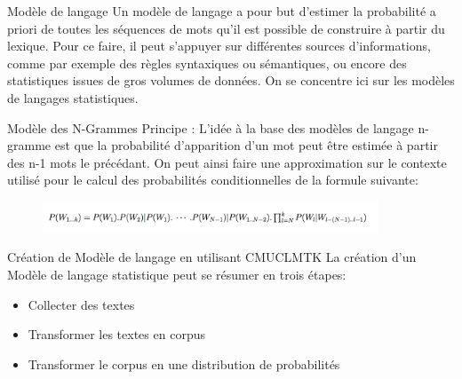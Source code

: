 \begin{frame}{Modèle de langage}
Un modèle de langage a pour but d’estimer la probabilité a priori de toutes les séquences de mots qu’il est
possible de construire à partir du lexique. Pour ce faire, il peut s’appuyer sur différentes
sources d’informations, comme par exemple des règles syntaxiques ou sémantiques, ou
encore des statistiques issues de gros volumes de données. On se concentre ici
sur les modèles de langages statistiques.
\end{frame}


\begin{frame}{Modèle des N-Grammes}
Principe : L’idée à la base des modèles de langage n-gramme est que la probabilité d’apparition
d’un mot peut être estimée à partir des n-1 mots le précédant. On peut ainsi faire
une approximation sur le contexte utilisé pour le calcul des probabilités conditionnelles
de la formule suivante:

\begin{figure}
\centering
\includegraphics[width=10cm]{images/modele_langage.png}
\end{figure}

\end{frame}

\begin{frame}{Création de Modèle de langage en utilisant CMUCLMTK}
La création d'un Modèle de langage statistique peut se résumer en trois étapes:
\begin{itemize}
\item Collecter des textes
\item Transformer les textes en corpus
\item Transformer le corpus en une distribution de probabilités
\end{itemize}
\end{frame}


